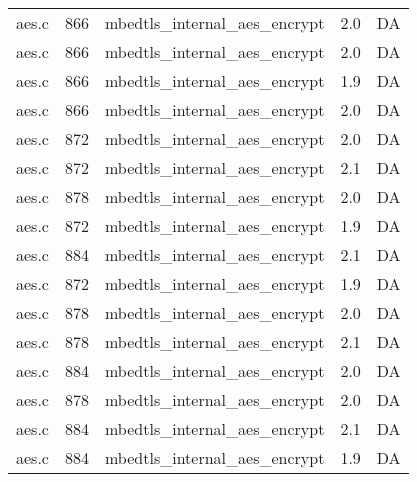 \begin{table}[!ht]
\begin{tabular}{lrlrr}
aes.c& 866&mbedtls\_internal\_aes\_encrypt&2.0 &DA\\
aes.c& 866&mbedtls\_internal\_aes\_encrypt&2.0 &DA\\
aes.c& 866&mbedtls\_internal\_aes\_encrypt&1.9 &DA\\
aes.c& 866&mbedtls\_internal\_aes\_encrypt&2.0 &DA\\
aes.c& 872&mbedtls\_internal\_aes\_encrypt&2.0 &DA\\
aes.c& 872&mbedtls\_internal\_aes\_encrypt&2.1 &DA\\
aes.c& 878&mbedtls\_internal\_aes\_encrypt&2.0 &DA\\
aes.c& 872&mbedtls\_internal\_aes\_encrypt&1.9 &DA\\
aes.c& 884&mbedtls\_internal\_aes\_encrypt&2.1 &DA\\
aes.c& 872&mbedtls\_internal\_aes\_encrypt&1.9 &DA\\
aes.c& 878&mbedtls\_internal\_aes\_encrypt&2.0 &DA\\
aes.c& 878&mbedtls\_internal\_aes\_encrypt&2.1 &DA\\
aes.c& 884&mbedtls\_internal\_aes\_encrypt&2.0 &DA\\
aes.c& 878&mbedtls\_internal\_aes\_encrypt&2.0 &DA\\
aes.c& 884&mbedtls\_internal\_aes\_encrypt&2.1 &DA\\
aes.c& 884&mbedtls\_internal\_aes\_encrypt&1.9 &DA\\
\hline
\end{tabular}
\renewcommand{\baselinestretch}{1.0}\selectfont
\end{table}
